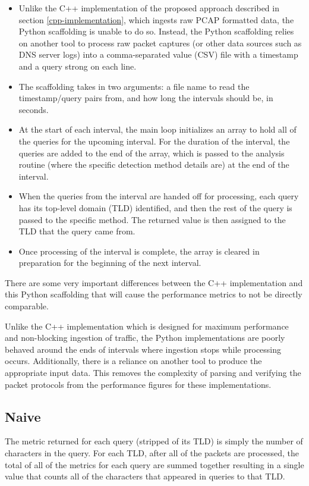 \documentclass[12pt]{report}
\theoremstyle{remark}
\theoremstyle{definition}
\theoremstyle{definition}
\theoremstyle{definition}
\begin{document}
\begin{itemize} \item Unlike the C++ implementation of the proposed approach
described in section \ref{cpp-implementation}, which ingests raw PCAP formatted
data, the Python scaffolding is unable to do so. Instead, the Python scaffolding
relies on another tool to process raw packet captures (or other data sources
such as DNS server logs) into a comma-separated value (CSV) file with a
timestamp and a query strong on each line.

\item The scaffolding takes in two arguments: a file name to read the
timestamp/query pairs from, and how long the intervals should be, in seconds.

\item At the start of each interval, the main loop initializes an array to hold
all of the queries for the upcoming interval. For the duration of the interval,
the queries are added to the end of the array, which is passed to the analysis
routine (where the specific detection method details are) at the end of the
interval.

\item When the queries from the interval are handed off for processing, each
query has its top-level domain (TLD) identified, and then the rest of the query
is passed to the specific method. The returned value is then assigned to the TLD
that the query came from.

\item Once processing of the interval is complete, the array is cleared in
preparation for the beginning of the next interval.

\end{itemize}

There are some very important differences between the C++ implementation and
this Python scaffolding that will cause the performance metrics to not be
directly comparable.

Unlike the C++ implementation which is designed for maximum performance and
non-blocking ingestion of traffic, the Python implementations are poorly behaved
around the ends of intervals where ingestion stops while processing occurs.
Additionally, there is a reliance on another tool to produce the appropriate 
input data. This removes the complexity of
parsing and verifying the packet protocols from the performance figures for
these implementations.

\subsection{Naive}
\label{implementation-naive}
The metric returned for each query (stripped of its TLD) is simply the number of
characters in the query. For each TLD, after all of the packets are processed,
the total of all of the metrics for each query are summed together resulting in
a single value that counts all of the characters that appeared in queries to
that TLD.
\end{document}
